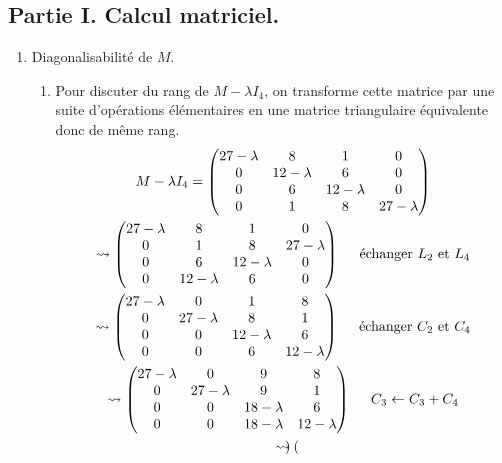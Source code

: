 \subsection*{Partie I. Calcul matriciel.}
\begin{enumerate}
  \item Diagonalisabilité de $M$.
\begin{enumerate}
  \item Pour discuter du rang de $M-\lambda I_4$, on transforme cette matrice par une suite d'opérations élémentaires en une matrice triangulaire équivalente donc de même rang.
\begin{multline*}
M - \lambda I_4 = 
\begin{pmatrix}
27 - \lambda & 8 & 1 & 0 \\ 0 & 12 - \lambda & 6 & 0 \\
0 & 6 & 12 - \lambda & 0 \\ 0 & 1 & 8 & 27 - \lambda
\end{pmatrix} \\
\rightsquigarrow 
\begin{pmatrix}
27 - \lambda & 8 & 1 & 0 \\ 0 & 1 & 8 & 27 - \lambda  \\
0 & 6 & 12 - \lambda & 0 \\ 0 & 12 - \lambda & 6 & 0
\end{pmatrix}
\hspace{0.5cm} \text{échanger $L_2$ et $L_4$} \\
\rightsquigarrow 
\begin{pmatrix}
27 - \lambda & 0 & 1 & 8 \\ 0 & 27 - \lambda  & 8 & 1 \\
0 & 0 & 12 - \lambda & 6 \\ 0 & 0 & 6 & 12 - \lambda
\end{pmatrix}
\hspace{0.5cm} \text{échanger $C_2$ et $C_4$} \\
\rightsquigarrow 
\begin{pmatrix}
27 - \lambda & 0 & 9 & 8 \\ 0 & 27 - \lambda  & 9 & 1 \\
0 & 0 & 18 - \lambda & 6 \\ 0 & 0 & 18 - \lambda & 12 - \lambda
\end{pmatrix}
\hspace{0.5cm} C_3 \leftarrow C_3+C_4  \\
\rightsquigarrow 
\begin{pmatrix}

\end{pmatrix}
\end{multline*}
\end{enumerate}
\end{enumerate}
